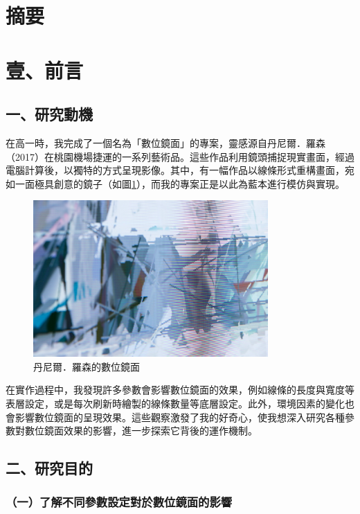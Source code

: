 \documentclass[12pt]{article}
\begin{document}
\section{摘要}

\newpage
\section{壹、前言}

\subsection{一、研究動機}

在高一時，我完成了一個名為「數位鏡面」的專案，靈感源自丹尼爾．羅森（2017）在桃園機場捷運的一系列藝術品。這些作品利用鏡頭捕捉現實畫面，經過電腦計算後，以獨特的方式呈現影像。其中，有一幅作品以線條形式重構畫面，宛如一面極具創意的鏡子（如圖\ref{fig:mirror_example_1}），而我的專案正是以此為藍本進行模仿與實現。

\begin{figure}[htbp]
  \centering
  \includegraphics[width=0.8\textwidth]{img//mirror_example_1.jpg}
  \caption{丹尼爾．羅森的數位鏡面}\label{fig:mirror_example_1}
\end{figure}

在實作過程中，我發現許多參數會影響數位鏡面的效果，例如線條的長度與寬度等表層設定，或是每次刷新時繪製的線條數量等底層設定。此外，環境因素的變化也會影響數位鏡面的呈現效果。這些觀察激發了我的好奇心，使我想深入研究各種參數對數位鏡面效果的影響，進一步探索它背後的運作機制。

\subsection{二、研究目的}

\subsubsection{（一）了解不同參數設定對於數位鏡面的影響}
\end{document}
